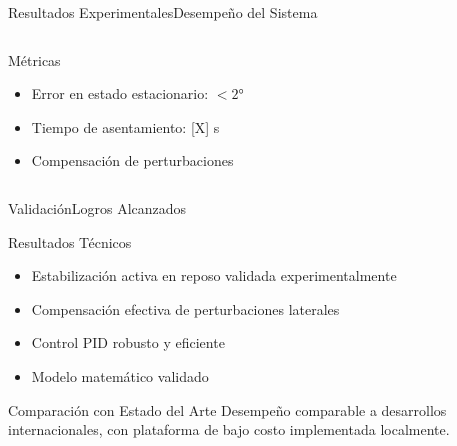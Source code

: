 \documentclass[10pt,xcolor={dvipsnames}]{beamer}
\begin{document}
\begin{frame}{Resultados Experimentales}{Desempeño del Sistema}

\begin{center}
\end{center}

\vspace{0.3cm}

\begin{columns}
\begin{block}{Métricas}
\begin{itemize}
    \item Error en estado estacionario: $< 2°$
    \item Tiempo de asentamiento: [X] s
    \item Compensación de perturbaciones
\end{itemize}
\end{block}

\end{columns}
\end{frame}

\begin{frame}{Validación}{Logros Alcanzados}

\begin{block}{Resultados Técnicos}
\begin{itemize}
    \item[$\checkmark$] Estabilización activa en reposo validada experimentalmente
    \item[$\checkmark$] Compensación efectiva de perturbaciones laterales
    \item[$\checkmark$] Control PID robusto y eficiente
    \item[$\checkmark$] Modelo matemático validado
\end{itemize}
\end{block}

\begin{center}
\end{center}

\begin{alertblock}{Comparación con Estado del Arte}
Desempeño comparable a desarrollos internacionales, con plataforma de bajo costo implementada localmente.
\end{alertblock}
\end{frame}
\end{document}
